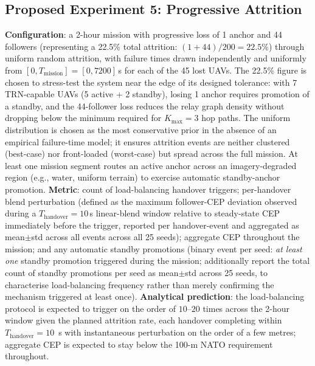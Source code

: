 \documentclass[conference,10pt]{IEEEtran}
\begin{document}
\subsection{Proposed Experiment 5: Progressive Attrition}

\textbf{Configuration}: a 2-hour mission with progressive loss of 1 anchor and 44 followers (representing a 22.5\% total attrition: $(1+44)/200 = 22.5\%$) through uniform random attrition, with failure times drawn independently and uniformly from $[0, T_\text{mission}] = [0, 7200]$\,s for each of the 45 lost UAVs. The 22.5\% figure is chosen to stress-test the system near the edge of its designed tolerance: with 7 TRN-capable UAVs (5 active + 2 standby), losing 1 anchor requires promotion of a standby, and the 44-follower loss reduces the relay graph density without dropping below the minimum required for $K_\text{max}=3$ hop paths. The uniform distribution is chosen as the most conservative prior in the absence of an empirical failure-time model; it ensures attrition events are neither clustered (best-case) nor front-loaded (worst-case) but spread across the full mission. At least one mission segment routes an active anchor across an imagery-degraded region (e.g., water, uniform terrain) to exercise automatic standby-anchor promotion.
\textbf{Metric}: count of load-balancing handover triggers; per-handover blend perturbation (defined as the maximum follower-CEP deviation observed during a $T_\text{handover}=10$\,s linear-blend window relative to steady-state CEP immediately before the trigger, reported per handover-event and aggregated as mean$\pm$std across all events across all 25 seeds); aggregate CEP throughout the mission; and any automatic standby promotions (binary event per seed: \emph{at least one} standby promotion triggered during the mission; additionally report the total count of standby promotions per seed as mean$\pm$std across 25 seeds, to characterise load-balancing frequency rather than merely confirming the mechanism triggered at least once). %
\textbf{Analytical prediction}: the load-balancing protocol is expected to trigger on the order of $10$--$20$ times across the 2-hour window given the planned attrition rate, each handover completing within $T_\text{handover}=10$~s with instantaneous perturbation on the order of a few metres; aggregate CEP is expected to stay below the 100-m NATO requirement throughout.
\end{document}
